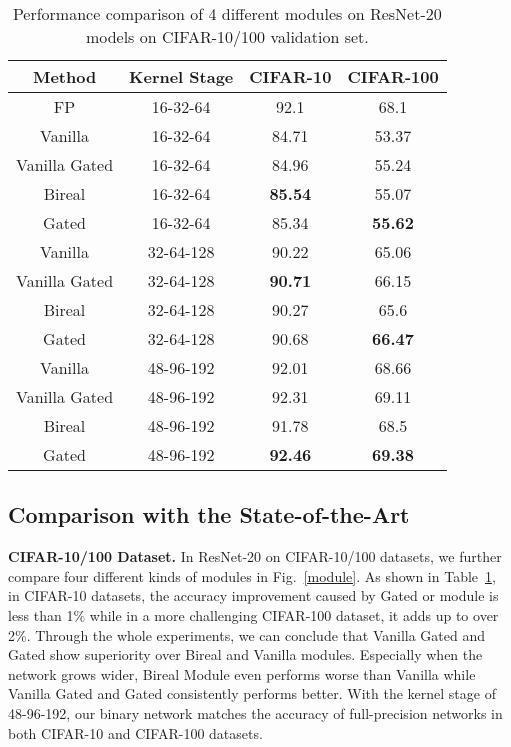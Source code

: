 \documentclass{article}
\begin{document}
\begin{table}
	\centering
	\small
	\renewcommand\arraystretch{1.05}
	\caption{Performance comparison of 4 different modules on ResNet-20 models on CIFAR-10/100 validation set.}
	\label{resnet-20 results}
	\vspace{0.5em}
	\begin{tabular}{|c||c|c|c|}
		\hline
		Method&Kernel Stage&CIFAR-10&CIFAR-100\\
		\hline
		\hline
		FP&16-32-64&92.1&68.1\\
		\hline
		Vanilla&16-32-64&84.71&53.37\\
		Vanilla Gated&16-32-64&84.96&55.24\\
		Bireal&16-32-64&\textbf{85.54}&55.07\\
		Gated&16-32-64&85.34&\textbf{55.62}\\
		\hline
		Vanilla&32-64-128&90.22&65.06\\
		Vanilla Gated&32-64-128&\textbf{90.71}&66.15\\
		Bireal&32-64-128&90.27&65.6\\
		Gated&32-64-128&90.68&\textbf{66.47}\\
		\hline 
		Vanilla&48-96-192&92.01&68.66\\
		Vanilla Gated&48-96-192&92.31&69.11\\
		Bireal&48-96-192&91.78&68.5\\
		Gated&48-96-192&\textbf{92.46}&\textbf{69.38}\\
		\hline
	\end{tabular}
	\vspace{-0.3in}
\end{table}

\subsection{Comparison with the State-of-the-Art}
\textbf{CIFAR-10/100 Dataset.}
In ResNet-20 on CIFAR-10/100 datasets, we further compare four different kinds of modules in Fig.~\ref{module}. As shown in Table~\ref{resnet-20 results}, in CIFAR-10 datasets, the accuracy improvement caused by Gated or module is less than 1\% while in a more challenging CIFAR-100 dataset, it adds up to over 2\%. Through the whole experiments, we can conclude that Vanilla Gated and Gated show superiority over Bireal and Vanilla modules. Especially when the network grows wider, Bireal Module even performs worse than Vanilla while Vanilla Gated and Gated consistently performs better. With the kernel stage of 48-96-192, our binary network matches the accuracy of full-precision networks in both CIFAR-10 and CIFAR-100 datasets.
\end{document}
